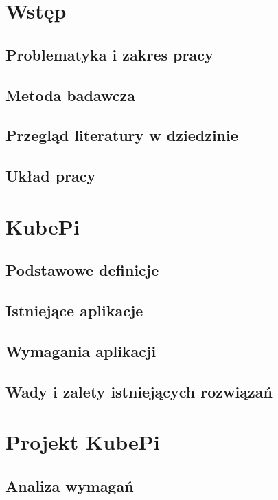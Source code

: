 \documentclass[12pt]{report}
\begin{document}
\tableofcontents    %

\chapter{Wstęp}\label{chap:wstep}

\section{Problematyka i zakres pracy}
\section{Metoda badawcza}
\section{Przegląd literatury w dziedzinie}
\section{Układ pracy}

\chapter{KubePi}\label{chap:kubepi}

\section{Podstawowe definicje}
\section{Istniejące aplikacje}
\section{Wymagania aplikacji}
\section{Wady i zalety istniejących rozwiązań}

\chapter{Projekt KubePi} \label{rozdz.czesc.prakt}
\section{Analiza wymagań}
\end{document}
